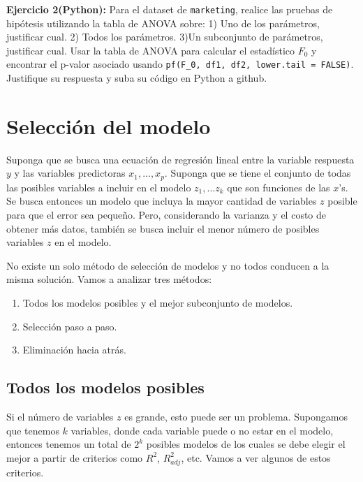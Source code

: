 \documentclass[
]{book}
\providecommand{\tightlist}{%
  \setlength{\itemsep}{0pt}\setlength{\parskip}{0pt}}
\begin{document}
\textbf{Ejercicio 2(Python):} Para el dataset de \texttt{marketing}, realice las pruebas de hipótesis utilizando la tabla de ANOVA sobre:
1) Uno de los parámetros, justificar cual.
2) Todos los parámetros.
3)Un subconjunto de parámetros, justificar cual.
Usar la tabla de ANOVA para calcular el estadístico \(F_0\) y encontrar el p-valor asociado usando \texttt{pf(F\_0,\ df1,\ df2,\ lower.tail\ =\ FALSE)}. Justifique su respuesta y suba su código en Python a github.

\section{Selección del modelo}\label{selecciuxf3n-del-modelo}

Suponga que se busca una ecuación de regresión lineal entre la variable respuesta \(y\) y las variables predictoras \(x_1,...,x_p\). Suponga que se tiene el conjunto de todas las posibles variables a incluir en el modelo \(z_1,...z_k\) que son funciones de las \(x\)'s. Se busca entonces un modelo que incluya la mayor cantidad de variables \(z\) posible para que el error sea pequeño. Pero, considerando la varianza y el costo de obtener más datos, también se busca incluir el menor número de posibles variables \(z\) en el modelo.

No existe un solo método de selección de modelos y no todos conducen a la misma solución. Vamos a analizar tres métodos:

\begin{enumerate}
\def\labelenumi{\arabic{enumi})}
\tightlist
\item
  Todos los modelos posibles y el mejor subconjunto de modelos.
\item
  Selección paso a paso.
\item
  Eliminación hacia atrás.
\end{enumerate}

\subsection{Todos los modelos posibles}\label{todos-los-modelos-posibles}

Si el número de variables \(z\) es grande, esto puede ser un problema. Supongamos que tenemos \(k\) variables, donde cada variable puede o no estar en el modelo, entonces tenemos un total de \(2^k\) posibles modelos de los cuales se debe elegir el mejor a partir de criterios como \(R^2\), \(R^2_{adj}\), etc. Vamos a ver algunos de estos criterios.
\end{document}
